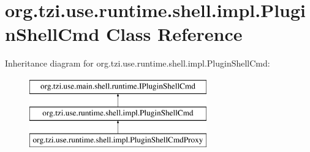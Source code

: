 \hypertarget{classorg_1_1tzi_1_1use_1_1runtime_1_1shell_1_1impl_1_1_plugin_shell_cmd}{\section{org.\-tzi.\-use.\-runtime.\-shell.\-impl.\-Plugin\-Shell\-Cmd Class Reference}
\label{classorg_1_1tzi_1_1use_1_1runtime_1_1shell_1_1impl_1_1_plugin_shell_cmd}
}
Inheritance diagram for org.\-tzi.\-use.\-runtime.\-shell.\-impl.\-Plugin\-Shell\-Cmd\-:\begin{figure}[H]
\begin{center}
\leavevmode
\includegraphics[height=3.000000cm]{classorg_1_1tzi_1_1use_1_1runtime_1_1shell_1_1impl_1_1_plugin_shell_cmd}
\end{center}
\end{figure}

